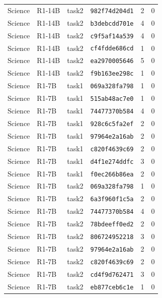 \begin{longtable}{llllrr}
Science & R1-14B & task2 & \texttt{982f74d204d1} & 2 & 0 \\
Science & R1-14B & task2 & \texttt{b3debcdd701e} & 4 & 0 \\
Science & R1-14B & task2 & \texttt{c9f5af14a539} & 4 & 0 \\
Science & R1-14B & task2 & \texttt{cf4fdde686cd} & 1 & 0 \\
Science & R1-14B & task2 & \texttt{ea2970005646} & 5 & 0 \\
Science & R1-14B & task2 & \texttt{f9b163ee298c} & 1 & 0 \\
Science & R1-7B & task1 & \texttt{069a328fa798} & 1 & 0 \\
Science & R1-7B & task1 & \texttt{515ab48ac7e0} & 1 & 0 \\
Science & R1-7B & task1 & \texttt{74477370b584} & 4 & 0 \\
Science & R1-7B & task1 & \texttt{928c6c5fa2ef} & 2 & 0 \\
Science & R1-7B & task1 & \texttt{97964e2a16ab} & 2 & 0 \\
Science & R1-7B & task1 & \texttt{c820f4639c69} & 2 & 0 \\
Science & R1-7B & task1 & \texttt{d4f1e274ddfc} & 3 & 0 \\
Science & R1-7B & task1 & \texttt{f0ec266b86ea} & 2 & 0 \\
Science & R1-7B & task2 & \texttt{069a328fa798} & 1 & 0 \\
Science & R1-7B & task2 & \texttt{6a3f960f1c5a} & 2 & 0 \\
Science & R1-7B & task2 & \texttt{74477370b584} & 4 & 0 \\
Science & R1-7B & task2 & \texttt{78bdeeff0ed2} & 2 & 0 \\
Science & R1-7B & task2 & \texttt{806724952218} & 3 & 0 \\
Science & R1-7B & task2 & \texttt{97964e2a16ab} & 2 & 0 \\
Science & R1-7B & task2 & \texttt{c820f4639c69} & 2 & 0 \\
Science & R1-7B & task2 & \texttt{cd4f9d762471} & 3 & 0 \\
Science & R1-7B & task2 & \texttt{eb877ceb6c1e} & 1 & 0 \\
\end{longtable}
